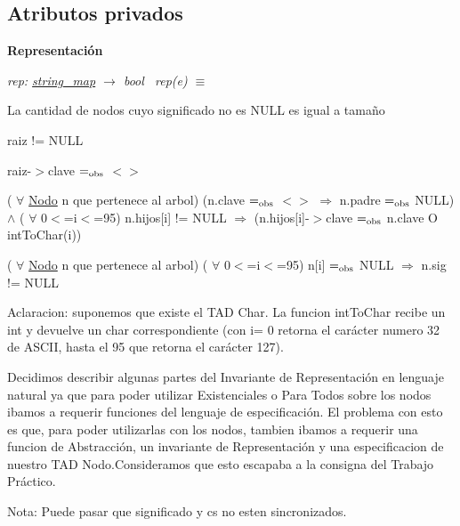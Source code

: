 \subsection*{Atributos privados}
\begin{Indent}{\bf Representación}\par
{\em rep\+: \hyperlink{classstring__map}{string\+\_\+map} $\to$ bool~\newline
 rep(e) $\equiv$
\begin{DoxyItemize}
\item La cantidad de nodos cuyo significado no es N\+U\+L\+L es igual a tamaño
\item raiz != N\+U\+L\+L
\item raiz-\/$>$clave $=_{\rm obs}$ $<$$>$
\item ( $\forall$ \hyperlink{structstring__map_1_1Nodo}{Nodo} n que pertenece al arbol) (n.\+clave $=_{\rm obs}$ $<$$>$ $\Rightarrow$ n.\+padre $=_{\rm obs}$ N\+U\+L\+L) $\land$ ( $\forall$ 0$<$=i$<$=95) n.\+hijos\mbox{[}i\mbox{]} != N\+U\+L\+L $\Rightarrow$ (n.\+hijos\mbox{[}i\mbox{]}-\/$>$clave $=_{\rm obs}$ n.\+clave O int\+To\+Char(i))
\item ( $\forall$ \hyperlink{structstring__map_1_1Nodo}{Nodo} n que pertenece al arbol) ( $\forall$ 0$<$=i$<$=95) n\mbox{[}i\mbox{]} $=_{\rm obs}$ N\+U\+L\+L $\Rightarrow$ n.\+sig != N\+U\+L\+L~\newline

\end{DoxyItemize}

Aclaracion\+: suponemos que existe el T\+A\+D Char. La funcion int\+To\+Char recibe un int y devuelve un char correspondiente (con i= 0 retorna el carácter numero 32 de A\+S\+C\+I\+I, hasta el 95 que retorna el carácter 127).

Decidimos describir algunas partes del Invariante de Representación en lenguaje natural ya que para poder utilizar Existenciales o Para Todos sobre los nodos ibamos a requerir funciones del lenguaje de especificación. El problema con esto es que, para poder utilizarlas con los nodos, tambien ibamos a requerir una funcion de Abstracción, un invariante de Representación y una especificacion de nuestro T\+A\+D Nodo.\+Consideramos que esto escapaba a la consigna del Trabajo Práctico.~\newline


Nota\+: Puede pasar que significado y cs no esten sincronizados.~\newline


}
\end{Indent}
